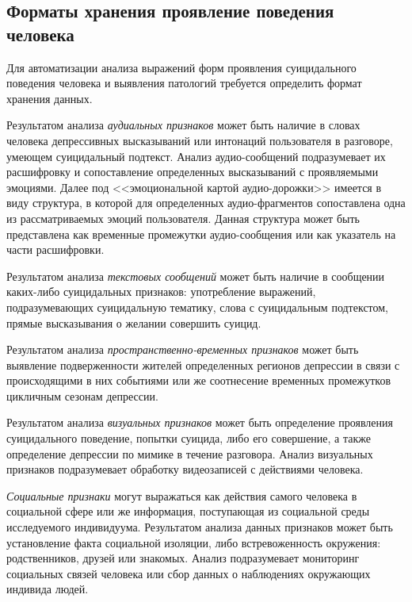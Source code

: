 \subsection{Форматы хранения проявление поведения человека}

Для автоматизации анализа выражений форм проявления суицидального поведения человека и выявления патологий требуется определить формат хранения данных.

Результатом анализа \textit{аудиальных признаков} может быть наличие в словах человека депрессивных высказываний или интонаций пользователя в разговоре, умеющем суицидальный подтекст. Анализ аудио-сообщений подразумевает их расшифровку и сопоставление определенных высказываний с проявляемыми эмоциями. Далее под <<эмоциональной картой аудио-дорожки>> имеется в виду структура, в которой для определенных аудио-фрагментов сопоставлена одна из рассматриваемых эмоций пользователя. Данная структура может быть представлена как временные промежутки аудио-сообщения или как указатель на части расшифровки. 

Результатом анализа  \textit{текстовых сообщений} может быть наличие в сообщении каких-либо суицидальных признаков: употребление выражений, подразумевающих суицидальную тематику, слова с суицидальным подтекстом, прямые высказывания о желании совершить суицид.

Результатом анализа \textit{пространственно-временных признаков} может быть выявление подверженности жителей определенных регионов депрессии в связи с происходящими в них событиями или же соотнесение временных промежутков цикличным сезонам депрессии.

Результатом анализа \textit{визуальных признаков} может быть определение проявления суицидального поведение, попытки суицида, либо его совершение, а также определение депрессии по мимике в течение разговора. Анализ визуальных признаков подразумевает обработку видеозаписей с действиями человека.

\textit{Социальные признаки} могут выражаться как действия самого человека в социальной сфере или же информация, поступающая из социальной среды исследуемого индивидуума. Результатом анализа данных признаков может быть установление факта социальной изоляции, либо встревоженность окружения: родственников, друзей или знакомых. Анализ подразумевает мониторинг социальных связей человека или сбор данных о наблюдениях окружающих индивида людей.

